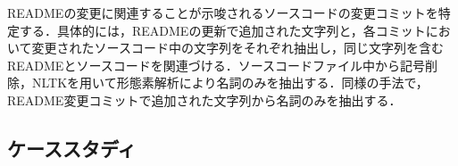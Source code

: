 \documentclass[uplatex,dvipdfmx,a4paper,twocolumn,base=11pt,jbase=11pt,ja=standard]{bxjsarticle}  %
\newcommand{\todo}[1]{\colorbox{yellow}{{\bf TODO}:}{\color{red} {\textbf{[#1]}}}}
\begin{document}
READMEの変更に関連することが示唆されるソースコードの変更コミットを特定する．具体的には，READMEの更新で追加された文字列と，各コミットにおいて変更されたソースコード中の文字列をそれぞれ抽出し，同じ文字列を含むREADMEとソースコードを関連づける．ソースコードファイル中から記号削除，NLTKを用いて形態素解析により名詞のみを抽出する．同様の手法で，README変更コミットで追加された文字列から名詞のみを抽出する．


%
%




\subsection{ケーススタディ}
\end{document}
